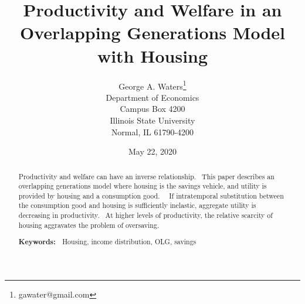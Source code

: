 \documentclass{article}
\begin{document}
\title{\textsf{Productivity and Welfare in an Overlapping Generations Model
with Housing}}
\author{\textsf{George A. Waters\thanks{%
gawater@gmail.com}} \\
\textsf{Department of Economics}\\
\textsf{Campus Box 4200}\\
\textsf{Illinois State University}\\
\textsf{Normal, IL 61790-4200}}
\date{\textsf{May 22, 2020}}
\maketitle

\begin{abstract}
Productivity and welfare can have an inverse relationship. \ This paper
describes an overlapping generations model where housing is the savings
vehicle, and utility is provided by housing and a consumption good. \ \ If
intratemporal substitution between the consumption good and housing is
sufficiently inelastic, aggregate utility is decreasing in productivity. \
At higher levels of productivity, the relative scarcity of housing
aggravates the problem of oversaving.

\textbf{Keywords: \ }Housing, income distribution, OLG, savings
\end{abstract}

\pagebreak 
\end{document}
